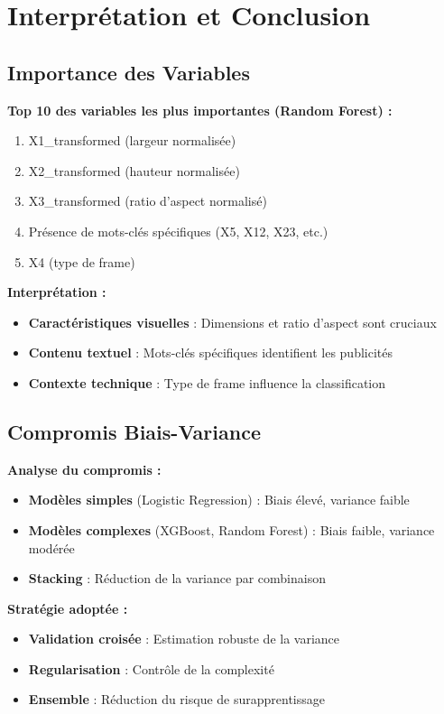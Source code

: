 \documentclass[12pt,a4paper]{article}
\begin{document}
\section{Interprétation et Conclusion}

\subsection{Importance des Variables}

\textbf{Top 10 des variables les plus importantes (Random Forest) :}
\begin{enumerate}
    \item X1\_transformed (largeur normalisée)
    \item X2\_transformed (hauteur normalisée)
    \item X3\_transformed (ratio d'aspect normalisé)
    \item Présence de mots-clés spécifiques (X5, X12, X23, etc.)
    \item X4 (type de frame)
\end{enumerate}

\textbf{Interprétation :}
\begin{itemize}
    \item \textbf{Caractéristiques visuelles} : Dimensions et ratio d'aspect sont cruciaux
    \item \textbf{Contenu textuel} : Mots-clés spécifiques identifient les publicités
    \item \textbf{Contexte technique} : Type de frame influence la classification
\end{itemize}

\subsection{Compromis Biais-Variance}

\textbf{Analyse du compromis :}
\begin{itemize}
    \item \textbf{Modèles simples} (Logistic Regression) : Biais élevé, variance faible
    \item \textbf{Modèles complexes} (XGBoost, Random Forest) : Biais faible, variance modérée
    \item \textbf{Stacking} : Réduction de la variance par combinaison
\end{itemize}

\textbf{Stratégie adoptée :}
\begin{itemize}
    \item \textbf{Validation croisée} : Estimation robuste de la variance
    \item \textbf{Regularisation} : Contrôle de la complexité
    \item \textbf{Ensemble} : Réduction du risque de surapprentissage
\end{itemize}
\end{document}
